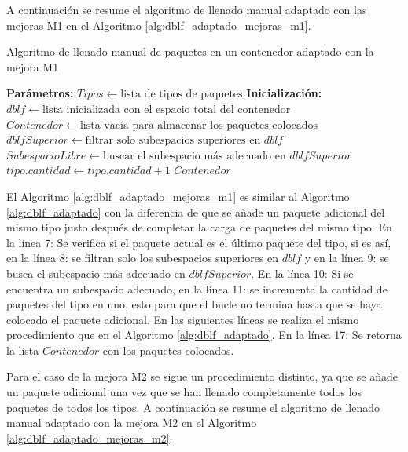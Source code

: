 \documentclass[openany]{article}
\begin{document}
A continuación se resume el algoritmo de llenado manual adaptado con las mejoras M1 en el Algoritmo \ref{alg:dblf_adaptado_mejoras_m1}.

\begin{algorithm}[H]
    \caption{Algoritmo de llenado manual de paquetes en un contenedor adaptado con la mejora M1}
    \label{alg:dblf_adaptado_mejoras_m1}
    \begin{algorithmic}[1]
        \State \textbf{Parámetros:} $Tipos \gets \text{lista de tipos de paquetes}$
        \State \textbf{Inicialización:} $dblf \gets \text{lista inicializada con el espacio total del contenedor}$
        \State $Contenedor \gets \text{lista vacía para almacenar los paquetes colocados}$
        \State {} 
        \State $dblfSuperior \gets \text{filtrar solo subespacios superiores en } dblf$
        \State $SubespacioLibre \gets \text{buscar el subespacio más adecuado en } dblfSuperior$
        \State $tipo.cantidad \gets tipo.cantidad + 1$
        \EndIf
        \EndIf
        \EndFor
        \State {} 
        \EndFor
        \State \Return $Contenedor$
    \end{algorithmic}
\end{algorithm}

El Algoritmo \ref{alg:dblf_adaptado_mejoras_m1} es similar al Algoritmo \ref{alg:dblf_adaptado} con la diferencia de que se añade un paquete adicional del mismo tipo justo después de completar la carga de paquetes del mismo tipo. En la línea 7: Se verifica si el paquete actual es el último paquete del tipo, si es así, en la línea 8: se filtran solo los subespacios superiores en $dblf$ y en la línea 9: se busca el subespacio más adecuado en $dblfSuperior$. En la línea 10: Si se encuentra un subespacio adecuado, en la línea 11: se incrementa la cantidad de paquetes del tipo en uno, esto para que el bucle no termina hasta que se haya colocado el paquete adicional. En las siguientes líneas se realiza el mismo procedimiento que en el Algoritmo \ref{alg:dblf_adaptado}. En la línea 17: Se retorna la lista $Contenedor$ con los paquetes colocados.

Para el caso de la mejora M2 se sigue un procedimiento distinto, ya que se añade un paquete adicional una vez que se han llenado completamente todos los paquetes de todos los tipos. A continuación se resume el algoritmo de llenado manual adaptado con la mejora M2 en el Algoritmo \ref{alg:dblf_adaptado_mejoras_m2}.
\end{document}
